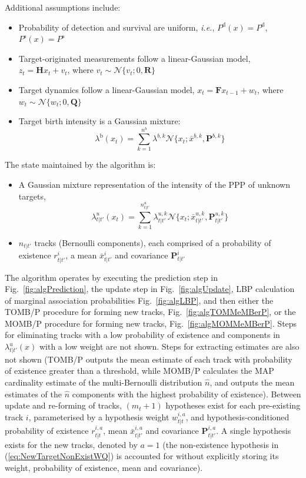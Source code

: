\documentclass[journal,twoside]{IEEEtran}
\theoremstyle{plain}
\begin{document}
Additional assumptions include:
%
\begin{itemize}
\item Probability of detection and survival are uniform, \textit{i.e.}\xspace, $P^{\mathrm{d}}(x)=P^{\mathrm{d}}$, $P^{\mathrm{s}}(x)=P^{\mathrm{s}}$
\item Target-originated measurements follow a linear-Gaussian model, $z_t = \mathbf{H} x_t + v_t$, where $v_t\sim\mathcal{N}\{v_t;0,\mathbf{R}\}$
\item Target dynamics follow a linear-Gaussian model, $x_t = \mathbf{F} x_{t-1} + w_t$, where $w_t\sim\mathcal{N}\{w_t;0,\mathbf{Q}\}$
\item Target birth intensity is a Gaussian mixture:
\[
\lambda^\mathrm{b}(x_t) = \sum_{k=1}^{n^b}\lambda^{b,k}\mathcal{N}\{x_t;\bar{x}^{b,k},\mathbf{P}^{b,k}\}
\]
\end{itemize}

The state maintained by the algorithm is:
%
\begin{itemize}
\item A Gaussian mixture representation of the intensity of the PPP of unknown targets,
\[
\lambda^u_{t|t'}(x_t) = \sum_{k=1}^{n^u_{t|t'}}\lambda^{u,k}_{t|t'}\mathcal{N}\{x_t;\bar{x}_{t|t'}^{u,k},\mathbf{P}_{t|t'}^{u,k}\}
\]
\item $n_{t|t'}$ tracks (Bernoulli components), each comprised of a probability of existence $r^i_{t|t'}$, a mean $\bar{x}^{i}_{t|t'}$ and covariance $\mathbf{P}^i_{t|t'}$
\end{itemize}
%
The algorithm operates by executing the prediction step in Fig.~\ref{fig:algPrediction}, the update step in Fig.~\ref{fig:algUpdate}, LBP calculation of marginal association probabilities Fig.~\ref{fig:algLBP}, and then either the TOMB/P procedure for forming new tracks, Fig.~\ref{fig:algTOMMeMBerP}, or the MOMB/P procedure for forming new tracks, Fig.~\ref{fig:algMOMMeMBerP}. Steps for eliminating tracks with a low probability of existence and components in $\lambda^u_{t|t'}(x)$ with a low weight are not shown. Steps for extracting estimates are also not shown (TOMB/P outputs the mean estimate of each track with probability of existence greater than a threshold, while MOMB/P calculates the MAP cardinality estimate of the multi-Bernoulli distribution $\hat{n}$, and outputs the mean estimates of the $\hat{n}$ components with the highest probability of existence). Between update and re-forming of tracks, $(m_t+1)$ hypotheses exist for each pre-existing track $i$, parameterised by a hypothesis weight $w^{i,a}_{t|t}$, and hypothesis-conditioned probability of existence $r^{i,a}_{t|t}$, mean $\bar{x}^{i,a}_{t|t'}$ and covariance $\mathbf{P}^{i,a}_{t|t'}$. A single hypothesis exists for the new tracks, denoted by $a=1$ (the non-existence hypothesis in (\ref{eq:NewTargetNonExistWQ}) is accounted for without explicitly storing its weight, probability of existence, mean and covariance).
\end{document}
